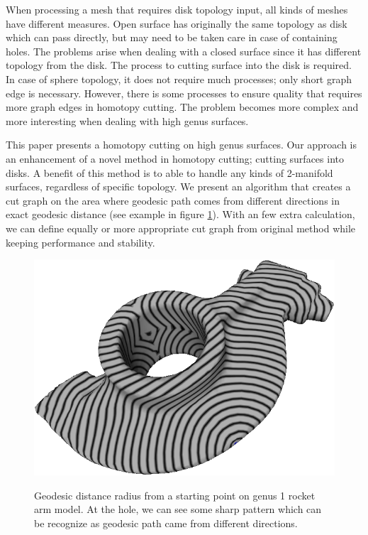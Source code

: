 \documentclass[a4paper,twoside]{article}
\begin{document}
When processing a mesh that requires disk topology input, all kinds of meshes have different measures. Open surface has originally the same topology as disk which can pass directly, but may need to be taken care in case of containing holes. The problems arise when dealing with a closed surface since it has different topology from the disk. The process to cutting surface into the disk is required. In case of sphere topology, it does not require much processes; only short graph edge is necessary. However, there is some processes to ensure quality that requires more graph edges in homotopy cutting. The problem becomes more complex and more interesting when dealing with high genus surfaces. 
   
This paper presents a homotopy cutting on high genus surfaces. Our approach is an enhancement of a novel method \cite{Gu:2002:GI:566654.566589} in homotopy cutting; cutting surfaces into disks. A benefit of this method is to able to handle any kinds of 2-manifold surfaces, regardless of specific topology. We present an algorithm that creates a cut graph on the area where geodesic path comes from different directions in exact geodesic distance \cite{Mitchell:1987:DGP:33367.33372,Surazhsky:2005:FEA:1073204.1073228} (see example in figure \ref{fig:geodesic rocket arm}). With an few extra calculation,  we can define equally or more appropriate cut graph from original method while keeping performance and stability.
\begin{figure}[!h]
	\centering
	{\includegraphics[width=0.9\columnwidth]{images/geodesic_rocket-arm.png}}
	\caption{Geodesic distance radius from a starting point on genus 1 rocket arm model. At the hole, we can see some sharp pattern which can be recognize as geodesic path came from different directions.}
	\label{fig:geodesic rocket arm}
\end{figure}
\end{document}
